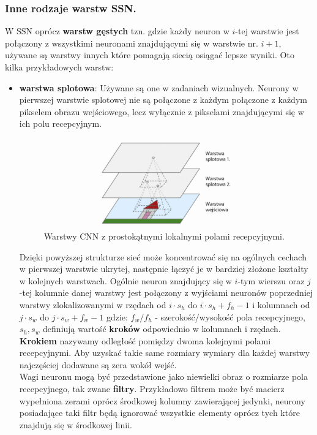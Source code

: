 \documentclass{article}
\begin{document}
\subsubsection{Inne rodzaje warstw SSN.}
W SSN oprócz \textbf{warstw gęstych} tzn.
gdzie każdy neuron w $i$-tej warstwie jest połączony z wszystkimi neuronami
znajdującymi się w warstwie nr. $i+1$,
używane są warstwy innych które pomagają siecią
osiągać lepsze wyniki. Oto kilka przykładowych warstw:
\begin{itemize}
\item \textbf{warstwa splotowa}:
Używane są one w zadaniach wizualnych. Neurony w pierwszej warstwie splotowej nie są
połączone z każdym połączone z każdym pikselem obrazu wejściowego, lecz wyłącznie z pikselami
znajdującymi się w ich polu recepcyjnym.

\begin{figure}[H]
\centering
\includegraphics[scale=0.6]{cnn.png}
\caption{Warstwy CNN z prostokątnymi lokalnymi polami recepcyjnymi.}
\end{figure}

Dzięki powyższej strukturze sieć może koncentrować się na ogólnych cechach w pierwszej warstwie
ukrytej, następnie łączyć je w bardziej złożone kształty w kolejnych warstwach. Ogólnie neuron
znajdujący się w $i$-tym wierszu oraz $j$-tej kolumnie danej warstwy jest połączony z wyjściami 
neuronów poprzedniej warstwy zlokalizowanymi w rzędach od $i \cdot s_h$ do 
$i \cdot s_h + f_h-1$  i kolumnach
od $j \cdot s_w $ do $j \cdot s_w + f_w-1$
gdzie: $f_w/f_h$ - szerokość/wysokość pola recepcyjnego, $s_h, s_w$ definiują wartość 
\textbf{kroków} odpowiednio w kolumnach i rzędach. \textbf{Krokiem} nazywamy odległość
pomiędzy dwoma kolejnymi polami recepcyjnymi. Aby uzyskać takie same rozmiary wymiary 
dla każdej warstwy najczęściej dodawane są zera wokół wejść.\\

Wagi neuronu mogą być przedstawione jako niewielki obraz o rozmiarze pola recepcyjnego, tak 
zwane \textbf{filtry}. Przykładowo filtrem może być macierz wypełniona zerami oprócz środkowej
kolumny zawierającej jedynki, neurony posiadające taki filtr będą ignorować wszystkie elementy
oprócz tych które znajdują się w środkowej linii.


\end{itemize}
\end{document}
